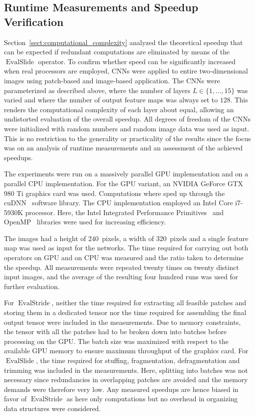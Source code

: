 \documentclass[journal]{IEEEtran}
\newcommand{\discint}[2]{\{#1,\dotsc,#2\}}
\newcommand{\inint}[2]{\in\discint{#1}{#2}}
\DeclareMathOperator{\EvalStride}{EvalStride}
\DeclareMathOperator{\EvalSlide}{EvalSlide}
\begin{document}
\subsection{Runtime Measurements and Speedup Verification}
Section~\ref{sect:computational_complexity} analyzed the theoretical speedup that can be expected if redundant computations are eliminated by means of the $\EvalSlide$ operator.
To confirm whether speed can be significantly increased when real processors are employed, CNNs were applied to entire two-dimensional images using patch-based and image-based application.
The CNNs were parameterized as described above, where the number of layers $L\inint{1}{15}$ was varied and where the number of output feature maps was always set to $128$.
This renders the computational complexity of each layer about equal, allowing an undistorted evaluation of the overall speedup.
All degrees of freedom of the CNNs were initialized with random numbers and random image data was used as input.
This is no restriction to the generality or practicality of the results since the focus was on an analysis of runtime measurements and an assessment of the achieved speedups.

The experiments were run on a massively parallel GPU implementation and on a parallel CPU implementation.
For the GPU variant, an NVIDIA GeForce GTX 980 Ti graphics card was used.
Computations where sped up through the cuDNN~\cite{Chetlur2014} software library.
The CPU implementation employed an Intel Core i7-5930K processor.
Here, the Intel Integrated Performance Primitives~\cite{Taylor2007} and OpenMP~\cite{Dagum1998} libraries were used for increasing efficiency.

The images had a height of $240$~pixels, a width of $320$~pixels and a single feature map was used as input for the networks.
The time required for carrying out both operators on GPU and on CPU was measured and the ratio taken to determine the speedup.
All measurements were repeated twenty times on twenty distinct input images, and the average of the resulting four hundred runs was used for further evaluation.

For $\EvalStride$, neither the time required for extracting all feasible patches and storing them in a dedicated tensor nor the time required for assembling the final output tensor were included in the measurements.
Due to memory constraints, the tensor with all the patches had to be broken down into batches before processing on the GPU.
The batch size was maximized with respect to the available GPU memory to ensure maximum throughput of the graphics card.
For $\EvalSlide$, the time required for stuffing, fragmentation, defragmentation and trimming was included in the measurements.
Here, splitting into batches was not necessary since redundancies in overlapping patches are avoided and the memory demands were therefore very low.
Any measured speedups are hence biased in favor of $\EvalStride$ as here only computations but no overhead in organizing data structures were considered.
\end{document}
